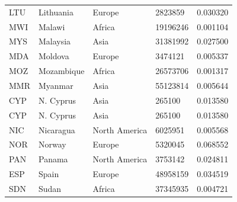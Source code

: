 \documentclass[11pt]{report}
\begin{document}
\begin{table}[h!]
\begin{tabular}{lllll}
            LTU                           & Lithuania                 & Europe                         & 2823859                       & 0.030320                           \\
            MWI                           & Malawi                    & Africa                         & 19196246                      & 0.001104                           \\
            MYS                           & Malaysia                  & Asia                           & 31381992                      & 0.027500                           \\
            MDA                           & Moldova                   & Europe                         & 3474121                       & 0.005337                           \\
            MOZ                           & Mozambique                & Africa                         & 26573706                      & 0.001317                           \\
            MMR                           & Myanmar                   & Asia                           & 55123814                      & 0.005644                           \\
            CYP                           & N. Cyprus                 & Asia                           & 265100                        & 0.013580                           \\
            CYP                           & N. Cyprus                 & Asia                           & 265100                        & 0.013580                           \\
            NIC                           & Nicaragua                 & North America                  & 6025951                       & 0.005568                           \\
            NOR                           & Norway                    & Europe                         & 5320045                       & 0.068552                           \\
            PAN                           & Panama                    & North America                  & 3753142                       & 0.024811                           \\
            ESP                           & Spain                     & Europe                         & 48958159                      & 0.034519                           \\
            SDN                           & Sudan                     & Africa                         & 37345935                      & 0.004721                           \\

\end{tabular}
\end{table}
\end{document}
